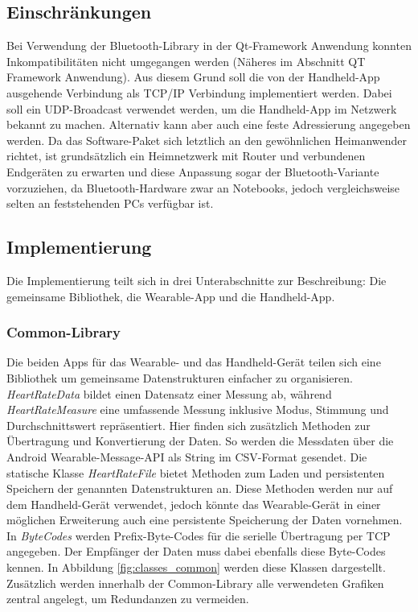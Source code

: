 \subsection{Einschränkungen}
Bei Verwendung der Bluetooth-Library in der Qt-Framework Anwendung konnten Inkompatibilitäten nicht umgegangen werden (Näheres im Abschnitt QT Framework Anwendung). Aus diesem Grund soll die von der Handheld-App ausgehende Verbindung als TCP/IP Verbindung implementiert werden. Dabei soll ein UDP-Broadcast verwendet werden, um die Handheld-App im Netzwerk bekannt zu machen. Alternativ kann aber auch eine feste Adressierung angegeben werden. Da das Software-Paket sich letztlich an den gewöhnlichen Heimanwender richtet, ist grundsätzlich ein Heimnetzwerk mit Router und verbundenen Endgeräten zu erwarten und diese Anpassung sogar der Bluetooth-Variante vorzuziehen, da Bluetooth-Hardware zwar an Notebooks, jedoch vergleichsweise selten an feststehenden PCs verfügbar ist.

\subsection{Implementierung}
Die Implementierung teilt sich in drei Unterabschnitte zur Beschreibung: Die gemeinsame Bibliothek, die Wearable-App und die Handheld-App.
\subsubsection{Common-Library}
Die beiden Apps für das Wearable- und das Handheld-Gerät teilen sich eine Bibliothek um gemeinsame Datenstrukturen einfacher zu organisieren. \textit{HeartRateData} bildet einen Datensatz einer Messung ab, während \textit{HeartRateMeasure} eine umfassende Messung inklusive Modus, Stimmung und Durchschnittswert repräsentiert. Hier finden sich zusätzlich Methoden zur Übertragung und Konvertierung der Daten. So werden die Messdaten über die Android Wearable-Message-API als String im CSV-Format gesendet. Die statische Klasse \textit{HeartRateFile} bietet Methoden zum Laden und persistenten Speichern der genannten Datenstrukturen an. Diese Methoden werden nur auf dem Handheld-Gerät verwendet, jedoch könnte das Wearable-Gerät in einer möglichen Erweiterung auch eine persistente Speicherung der Daten vornehmen. In \textit{ByteCodes} werden Prefix-Byte-Codes für die serielle Übertragung per TCP angegeben. Der Empfänger der Daten muss dabei ebenfalls diese Byte-Codes kennen. In Abbildung \ref{fig:classes_common} werden diese Klassen dargestellt. Zusätzlich werden innerhalb der Common-Library alle verwendeten Grafiken zentral angelegt, um Redundanzen zu vermeiden.

